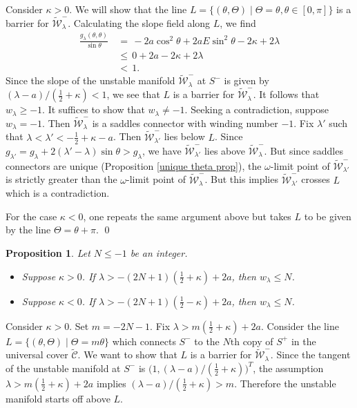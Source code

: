 \documentclass[11 pt]{article}
\newtheorem{prop}[thm]{Proposition}%
\renewcommand\l{\lambda}
\renewcommand\({\left(}
\renewcommand\){\right)}
\newcommand\wt{\widetilde}
\newcommand\<{\langle}
\renewcommand\>{\rangle}
\renewcommand\l{\lambda}
\newcommand\8{\infty}
\newcommand{\mc}{\mathcal}
\begin{document}
\proof
Consider $\kappa > 0$. We will show that the line $L = \{(\theta, \Theta) \mid \Theta = \theta, \theta \in [0, \pi]\}$ is a barrier for $\wt{\mc{W}}_\l^-$. Calculating the slope field along $L$, we find 
\begin{align*}
\frac{g_\l(\theta, \theta)}{\sin \theta} \,&=\, -2a\cos^2\theta + 2aE \sin^2 \theta - 2\kappa + 2\l
\\
&\leq \, 0 + 2a - 2\kappa + 2\l
\\
&<\, 1.
\end{align*}
Since the slope of the unstable manifold $\mc{\wt{W}}_\l^-$
at $S^-$ is given by $(\l-a)/(\frac{1}{2} + \kappa) < 1$, we see that $L$ is a barrier for $\wt{\mc{W}}_\l^-$. It follows that $w_\l \geq -1$. It suffices to show that $w_\l \neq -1$. Seeking a contradiction, suppose $w_\l = -1$. Then $\wt{\mc{W}}^-_\l$ is a saddles connector with winding number $-1$. Fix $\l'$ such that $\l < \l' < -\frac{1}{2} + \kappa -a$. Then $\wt{\mc{W}}^-_{\l'}$ lies below $L$. Since $g_{\l'} = g_\l + 2(\l' - \l)\sin \theta > g_\l$, we have $\wt{\mc{W}}^-_{\l'}$ lies above $\wt{\mc{W}}^-_\l$. But since saddles connectors are unique (Proposition \ref{unique theta prop}), the $\omega$-limit point of $\wt{\mc{W}}^-_{\l'}$ is strictly greater than the $\omega$-limit point of $\wt{\mc{W}}^-_{\l}$. But this implies $\wt{\mc{W}}^-_{\l'}$ crosses $L$ which is a contradiction.

For the case $\kappa < 0$, one repeats the same argument above but takes $L$ to be given by the line $\Theta = \theta + \pi$. 
\qed

\medskip
\medskip

\begin{prop}\label{neg wind num theta prop 2}
Let $N \leq -1$ be an integer. 
\begin{itemize}
\item[$\bullet$] Suppose $\kappa > 0$. 
If $\l > -(2N+1)(\frac{1}{2} +\kappa) + 2a$, then $w_\l \leq N$. 

\item[$\bullet$] Suppose $\kappa < 0$. If $\l > -(2N+1)(\frac{1}{2} -\kappa) + 2a$, then $w_\l \leq N$. 
\end{itemize}
\end{prop}

\proof
Consider $\kappa > 0$. Set $m = -2N - 1$. Fix $\l > m(\frac{1}{2} +\kappa) + 2a$.  Consider the line $L = \{ (\theta, \Theta) \mid \Theta = m\theta\}$ which connects $S^-$ to the $N\text{th}$ copy of $S^+$ in the universal cover $\wt{\mc{C}}$. We want to show that $L$ is a barrier for $\wt{\mc{W}}^-_\lambda$. Since the tangent of the unstable manifold at $S^-$ is $\big(1, (\l -a)/(\frac{1}{2} + \kappa)\big)^T$, the assumption $\l > m(\frac{1}{2} + \kappa) + 2a$ implies $(\l -a)/(\frac{1}{2} + \kappa) > m$. Therefore the unstable manifold starts off above $L$. 
\end{document}
